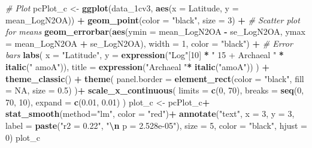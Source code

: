 \documentclass[
]{article}
\newenvironment{Shaded}{\begin{snugshade}}{\end{snugshade}}
\newcommand{\AttributeTok}[1]{\textcolor[rgb]{0.13,0.29,0.53}{#1}}
\newcommand{\CommentTok}[1]{\textcolor[rgb]{0.56,0.35,0.01}{\textit{#1}}}
\newcommand{\ConstantTok}[1]{\textcolor[rgb]{0.56,0.35,0.01}{#1}}
\newcommand{\DecValTok}[1]{\textcolor[rgb]{0.00,0.00,0.81}{#1}}
\newcommand{\FloatTok}[1]{\textcolor[rgb]{0.00,0.00,0.81}{#1}}
\newcommand{\FunctionTok}[1]{\textcolor[rgb]{0.13,0.29,0.53}{\textbf{#1}}}
\newcommand{\NormalTok}[1]{#1}
\newcommand{\OtherTok}[1]{\textcolor[rgb]{0.56,0.35,0.01}{#1}}
\newcommand{\SpecialCharTok}[1]{\textcolor[rgb]{0.81,0.36,0.00}{\textbf{#1}}}
\newcommand{\StringTok}[1]{\textcolor[rgb]{0.31,0.60,0.02}{#1}}
\begin{document}
\begin{Shaded}
\begin{Highlighting}[]
\CommentTok{\# Plot}
\NormalTok{pcPlot\_c }\OtherTok{\textless{}{-}} \FunctionTok{ggplot}\NormalTok{(data\_1cv3, }\FunctionTok{aes}\NormalTok{(}\AttributeTok{x =}\NormalTok{ Latitude, }\AttributeTok{y =}\NormalTok{ mean\_LogN2OA)) }\SpecialCharTok{+}
  \FunctionTok{geom\_point}\NormalTok{(}\AttributeTok{color =} \StringTok{"black"}\NormalTok{, }\AttributeTok{size =} \DecValTok{3}\NormalTok{) }\SpecialCharTok{+}  \CommentTok{\# Scatter plot for means}
  \FunctionTok{geom\_errorbar}\NormalTok{(}\FunctionTok{aes}\NormalTok{(}\AttributeTok{ymin =}\NormalTok{ mean\_LogN2OA }\SpecialCharTok{{-}}\NormalTok{ se\_LogN2OA, }\AttributeTok{ymax =}\NormalTok{ mean\_LogN2OA }\SpecialCharTok{+}\NormalTok{ se\_LogN2OA), }
                \AttributeTok{width =} \DecValTok{1}\NormalTok{, }\AttributeTok{color =} \StringTok{"black"}\NormalTok{) }\SpecialCharTok{+}  \CommentTok{\# Error bars}
  \FunctionTok{labs}\NormalTok{(}
    \AttributeTok{x =} \StringTok{"Latitude"}\NormalTok{, }
    \AttributeTok{y =} \FunctionTok{expression}\NormalTok{(}\StringTok{"Log"}\NormalTok{[}\DecValTok{10}\NormalTok{] }\SpecialCharTok{*} \StringTok{" 15 + Archaeal "} \SpecialCharTok{*} \FunctionTok{italic}\NormalTok{(}\StringTok{" amoA"}\NormalTok{)),}
    \AttributeTok{title =}  \FunctionTok{expression}\NormalTok{(}\StringTok{"Archaeal "}\SpecialCharTok{*} \FunctionTok{italic}\NormalTok{(}\StringTok{"amoA"}\NormalTok{))}
\NormalTok{  ) }\SpecialCharTok{+}
  \FunctionTok{theme\_classic}\NormalTok{() }\SpecialCharTok{+}
  \FunctionTok{theme}\NormalTok{(}
    \AttributeTok{panel.border =} \FunctionTok{element\_rect}\NormalTok{(}\AttributeTok{color =} \StringTok{"black"}\NormalTok{, }\AttributeTok{fill =} \ConstantTok{NA}\NormalTok{, }\AttributeTok{size =} \FloatTok{0.5}\NormalTok{)}
\NormalTok{  )}\SpecialCharTok{+}
  \FunctionTok{scale\_x\_continuous}\NormalTok{(}
    \AttributeTok{limits =} \FunctionTok{c}\NormalTok{(}\DecValTok{0}\NormalTok{, }\DecValTok{70}\NormalTok{),      }
    \AttributeTok{breaks =} \FunctionTok{seq}\NormalTok{(}\DecValTok{0}\NormalTok{, }\DecValTok{70}\NormalTok{, }\DecValTok{10}\NormalTok{),}
    \AttributeTok{expand =} \FunctionTok{c}\NormalTok{(}\FloatTok{0.01}\NormalTok{, }\FloatTok{0.01}\NormalTok{)}
\NormalTok{  )}
\NormalTok{plot\_c }\OtherTok{\textless{}{-}}\NormalTok{ pcPlot\_c}\SpecialCharTok{+}
  \FunctionTok{stat\_smooth}\NormalTok{(}\AttributeTok{method=}\StringTok{"lm"}\NormalTok{, }\AttributeTok{color =} \StringTok{"red"}\NormalTok{)}\SpecialCharTok{+}
  \FunctionTok{annotate}\NormalTok{(}\StringTok{"text"}\NormalTok{, }
           \AttributeTok{x =} \DecValTok{3}\NormalTok{, }\AttributeTok{y =} \DecValTok{3}\NormalTok{,}
           \AttributeTok{label =} \FunctionTok{paste}\NormalTok{(}\StringTok{"r2 = 0.22"}\NormalTok{, }\StringTok{"}\SpecialCharTok{\textbackslash{}n}\StringTok{ p = 2.528e{-}05"}\NormalTok{), }
           \AttributeTok{size =} \DecValTok{5}\NormalTok{, }\AttributeTok{color =} \StringTok{"black"}\NormalTok{, }\AttributeTok{hjust =} \DecValTok{0}\NormalTok{)}
\NormalTok{plot\_c}
\end{Highlighting}
\end{Shaded}
\end{document}
